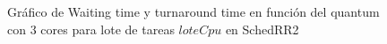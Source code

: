 \begin{figure}[H]
\hfill
{}
\hfill
{}
\hfill
\caption{Gráfico de Waiting time y turnaround time en función del quantum con 3 cores para lote de tareas $loteCpu$ en SchedRR2}
\end{figure}

